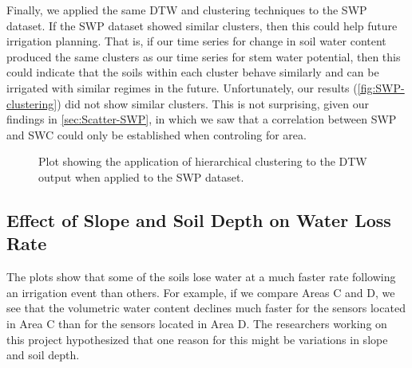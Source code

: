 \documentclass[12pt]{scrartcl}
\begin{document}
Finally, we applied the same DTW and clustering techniques to the SWP dataset. If the SWP dataset showed similar clusters, then this could help future irrigation planning. That is, if our time series for change in soil water content produced the same clusters as our time series for stem water potential, then this could indicate that the soils within each cluster behave similarly and can be irrigated with similar regimes in the future. Unfortunately, our results (\autoref{fig:SWP-clustering}) did not show similar clusters. This is not surprising, given our findings in \autoref{sec:Scatter-SWP}, in which we saw that a correlation between SWP and SWC could only be established when controling for area.


\begin{figure}[!htb]
        \caption{\label{fig:SWP-clustering} Plot showing the application of hierarchical clustering to the DTW output when applied to the SWP dataset.}
\end{figure}


\subsection{Effect of Slope and Soil Depth on Water Loss Rate}
The plots show that some of the soils lose water at a much faster rate following an irrigation event than others. For example, if we compare Areas C and D, we see that the volumetric water content declines much faster for the sensors located in Area C than for the sensors located in Area D. The researchers working on this project hypothesized that one reason for this might be variations in slope and soil depth.
\end{document}
